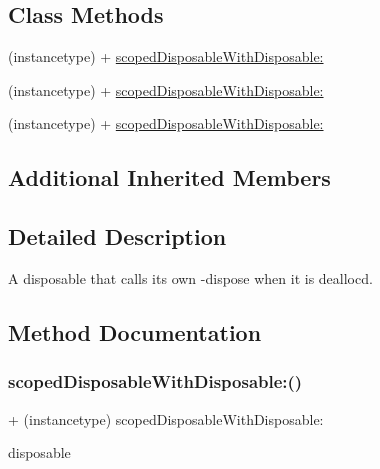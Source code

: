 \subsection*{Class Methods}
\begin{DoxyCompactItemize}
\item 
(instancetype) + \mbox{\hyperlink{interface_r_a_c_scoped_disposable_ad516f953166b5ef543c6df3e65310ed4}{scoped\+Disposable\+With\+Disposable\+:}}
\item 
(instancetype) + \mbox{\hyperlink{interface_r_a_c_scoped_disposable_ad516f953166b5ef543c6df3e65310ed4}{scoped\+Disposable\+With\+Disposable\+:}}
\item 
(instancetype) + \mbox{\hyperlink{interface_r_a_c_scoped_disposable_ad516f953166b5ef543c6df3e65310ed4}{scoped\+Disposable\+With\+Disposable\+:}}
\end{DoxyCompactItemize}
\subsection*{Additional Inherited Members}


\subsection{Detailed Description}
A disposable that calls its own -\/dispose when it is dealloc\textquotesingle{}d. 

\subsection{Method Documentation}
\mbox{\label{interface_r_a_c_scoped_disposable_ad516f953166b5ef543c6df3e65310ed4}} 
\subsubsection{\texorpdfstring{scoped\+Disposable\+With\+Disposable\+:()}{scopedDisposableWithDisposable:()}\hspace{0.1cm}{\footnotesize\ttfamily [1/3]}}
{\footnotesize\ttfamily + (instancetype) scoped\+Disposable\+With\+Disposable\+: \begin{DoxyParamCaption}\item[{(\mbox{\hyperlink{interface_r_a_c_disposable}{R\+A\+C\+Disposable}} $\ast$)}]{disposable }\end{DoxyParamCaption}}

